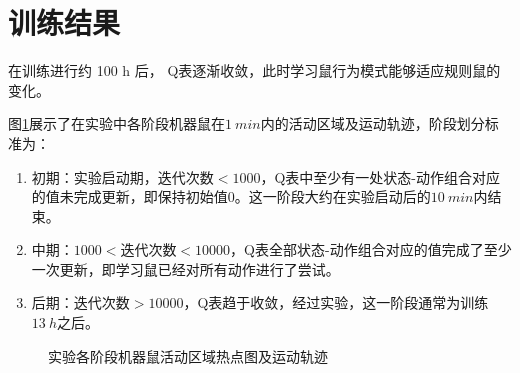 \section{训练结果}
在训练进行约 100 h 后， Q表逐渐收敛，此时学习鼠行为模式能够适应规则鼠的变化。

图\ref{figure_heatmap}展示了在实验中各阶段机器鼠在$1~min$内的活动区域及运动轨迹，阶段划分标准为：
\begin{enumerate}[leftmargin=0em, listparindent=2em, parsep=0em, topsep=0em, label=（\theenumi）]
\setlength{\itemindent}{4em}
\setlength{\labelsep}{0em}
\setlength{\labelwidth}{2em}
\setlength{\parsep}{0em}
\setlength{\itemsep}{0em}
\setlength{\topsep}{0em}
  \item 初期：实验启动期，迭代次数$<1000$，Q表中至少有一处状态-动作组合对应的值未完成更新，即保持初始值0。这一阶段大约在实验启动后的$10~min$内结束。
  \item 中期：$1000<$迭代次数$<10000$，Q表全部状态-动作组合对应的值完成了至少一次更新，即学习鼠已经对所有动作进行了尝试。
  \item 后期：迭代次数$>10000$，Q表趋于收敛，经过实验，这一阶段通常为训练$13~h$之后。
\end{enumerate}
\begin{figure}[htbp]
  \centering
  \caption{实验各阶段机器鼠活动区域热点图及运动轨迹}\label{figure_heatmap}
\end{figure}

